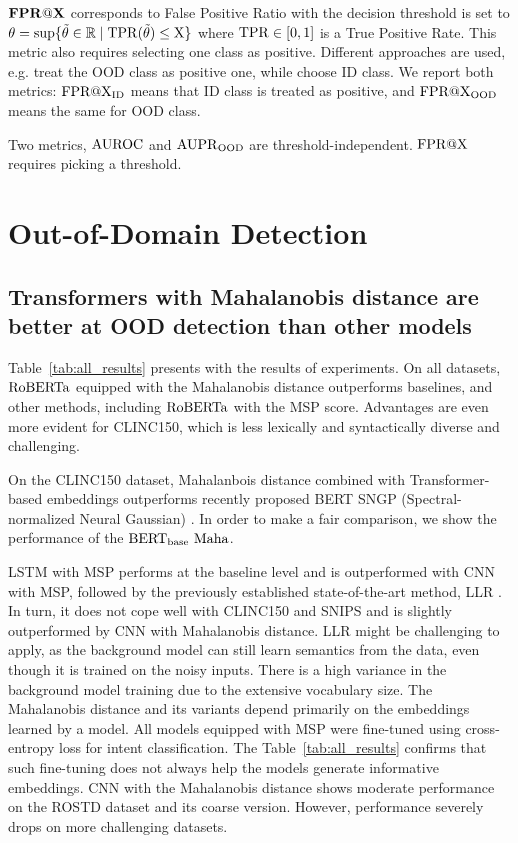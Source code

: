 \documentclass[letterpaper, final]{article} %
\begin{document}
$\rm{\mathbf{FPR@X}} $ corresponds to False Positive Ratio with the decision threshold is set to
$
 \theta = \sup \{\tilde\theta \in \mathbb{R} \mid \rm{TPR}(\tilde\theta) \leq X \}
$
where $\rm{TPR} \in [0,1]$ is a True Positive Rate. This metric also requires selecting one class as positive. Different approaches are used, e.g. \citet*{ll_ratio_nlp_facebook} treat the OOD class as positive one, while \citet*{zheng2020out} choose ID class. We report both metrics:  $\rm{FPR@X}_{ID}$ means that ID class is treated as positive, and $\rm{FPR@X}_{OOD}$ means the same for OOD class.


Two metrics, $\rm{AUROC}$ and $\rm{AUPR}_{OOD}$ are threshold-independent. $\rm{FPR@X} $ requires picking a threshold.



\section{Out-of-Domain Detection}
\label{sec: experiments}
\subsection{Transformers with Mahalanobis distance  are better at OOD detection than other models}

Table~\ref{tab:all_results} presents with the results of experiments. On all datasets, $\rm{RoBERTa}$ equipped with the Mahalanobis distance outperforms baselines, and other methods, including $\rm{RoBERTa}$ with the MSP score. Advantages are even more evident for CLINC150, which is less lexically and syntactically diverse and challenging.

On the CLINC150 dataset, Mahalanbois distance combined with  Transformer-based embeddings outperforms recently proposed BERT SNGP (Spectral-normalized Neural Gaussian) \cite{liu2020simple}. In order to make a fair comparison, we show the performance of the $\rm{BERT_{base}\ Maha}$.

LSTM with MSP performs at the baseline level and is outperformed with CNN with MSP, followed by the previously established state-of-the-art method, LLR \cite{ll_ratio_nlp_facebook}.
In turn, it does not cope well with CLINC150 and SNIPS and is slightly outperformed by CNN with Mahalanobis distance. LLR might be challenging to apply, as the background model can still learn semantics from the data, even though it is trained on the noisy inputs. There is a high variance in the background model training due to the extensive vocabulary size.
The Mahalanobis distance and its variants depend primarily on the embeddings learned by a model. All models equipped with MSP were fine-tuned using cross-entropy loss for intent classification.  The Table~\ref{tab:all_results} confirms that such fine-tuning does not always help the models generate informative embeddings. CNN with the Mahalanobis distance shows moderate performance on the ROSTD dataset and its coarse version. However, performance severely drops on more challenging datasets.
\end{document}
